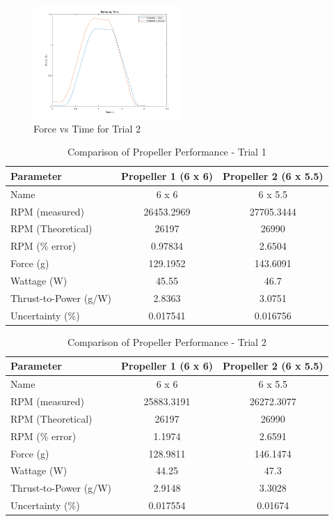 \documentclass{article}
\begin{document}
\begin{figure}[H]
  \centering
  \includegraphics[width = 0.5\textwidth]{finalprojectimages/Trial2_ForcevTime.png}
  \caption{Force vs Time for Trial 2}
  \label{fig:forcevtime2}
\end{figure}

\begin{table}[H]
  \centering
  \begin{tabular}{lcc}
  \hline
  \textbf{Parameter} & \textbf{Propeller 1 (6 x 6)} & \textbf{Propeller 2 (6 x 5.5)} \\
  \hline
  Name & 6 x 6 & 6 x 5.5 \\
  RPM (measured) & 26453.2969 & 27705.3444 \\
  RPM (Theoretical) & 26197 & 26990 \\
  RPM (\% error) & 0.97834 & 2.6504 \\
  Force (g) & 129.1952 & 143.6091 \\
  Wattage (W) & 45.55 & 46.7 \\
  Thrust-to-Power (g/W) & 2.8363 & 3.0751 \\
  Uncertainty (\%) & 0.017541 & 0.016756 \\
  \hline
  \end{tabular}
  \caption{Comparison of Propeller Performance - Trial 1}
  \label{table:propeller_comparison1}
  \end{table}

  
\begin{table}[h!]
  \centering
  \begin{tabular}{lcc}
  \hline
  \textbf{Parameter} & \textbf{Propeller 1 (6 x 6)} & \textbf{Propeller 2 (6 x 5.5)} \\
  \hline
  Name & 6 x 6 & 6 x 5.5 \\
  RPM (measured) & 25883.3191 & 26272.3077 \\
  RPM (Theoretical) & 26197 & 26990 \\
  RPM (\% error) & 1.1974 & 2.6591 \\
  Force (g) & 128.9811 & 146.1474 \\
  Wattage (W) & 44.25 & 47.3 \\
  Thrust-to-Power (g/W) & 2.9148 & 3.3028 \\
  Uncertainty (\%) & 0.017554 & 0.01674 \\
  \hline
  \end{tabular}
  \caption{Comparison of Propeller Performance - Trial 2}
  \label{table:propeller_performance2}
  \end{table}
  
\end{document}
